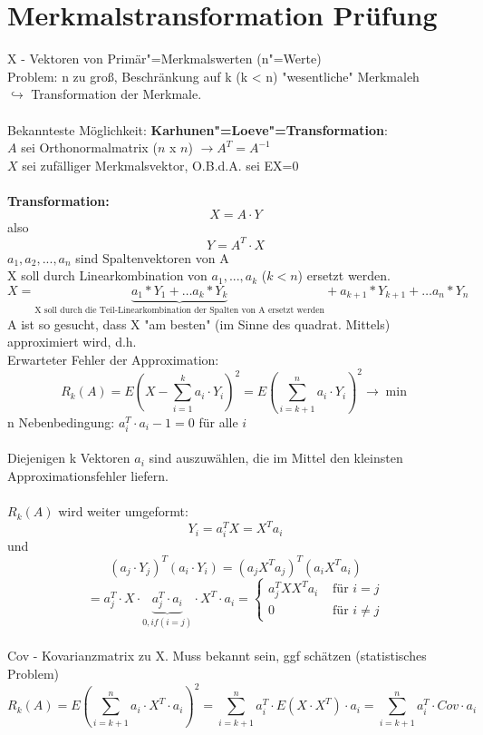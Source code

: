 \documentclass[a4paper,12pt]{scrreprt}
\newcommand{\Nb}[1]{\textbf{#1}}
\begin{document}
\section{Merkmalstransformation Prüfung}
X - Vektoren von Primär"=Merkmalswerten (n"=Werte)\\
Problem: n zu groß, Beschränkung auf k (k < n) "wesentliche" Merkmaleh\\
$\hookrightarrow$ Transformation der Merkmale.\\
\\
Bekannteste Möglichkeit: \Nb{Karhunen"=Loeve"=Transformation}:\\
$A$ sei Orthonormalmatrix ($n$ x $n$) $ \to A^T = A^{-1}$\\
$X$ sei zufälliger Merkmalsvektor, O.B.d.A. sei EX=0\\
\\
\Nb{Transformation:}\\
$$X=A\cdot Y$$
also
$$Y=A^T\cdot X$$
$a_1, a_2, ..., a_n$ sind Spaltenvektoren von A\\
X soll durch Linearkombination von $a_1,...,a_k$ ($k<n$) ersetzt
werden.\\
$$X=\underbrace{a_1*Y_1+ \dots a_k*Y_k}_{\text{X soll durch die Teil-Linearkombination der Spalten von A ersetzt werden}} + a_{k+1}*Y_{k+1} +\dots a_n*Y_n$$
A ist so gesucht, dass X "am besten" (im Sinne des quadrat. Mittels) approximiert wird, d.h.\\
Erwarteter Fehler der Approximation:\\
$$R_k(A)=E(X-\sum\limits_{i=1}^k a_i\cdot Y_i)^2 =
E(\sum\limits_{i=k+1}^n a_i\cdot Y_i)^2 \to \min$$
n Nebenbedingung: $a_i^T\cdot a_i -1 = 0$ für alle $i$\\
\\
Diejenigen k Vektoren $a_i$ sind auszuwählen, die im Mittel den kleinsten
Approximationsfehler liefern.\\
\\
$R_k(A)$ wird weiter umgeformt:
$$Y_i=a_i^TX=X^Ta_i$$
und\\ 
$$(a_j\cdot Y_j)^T(a_i\cdot Y_i) = (a_jX^Ta_j)^T(a_iX^Ta_i) $$
$$= a_j^T\cdot X\cdot \underbrace{ a_j^T\cdot a_i}_{0, if(i=j)} \cdot X^T\cdot a_i =
\left \{ \begin{matrix} a^T_j XX^T a_i &\text{ für }i=j \\ 0 &\text{ für } i\not =
j\end{matrix} \right.$$
\\
Cov - Kovarianzmatrix zu X. Muss bekannt sein, ggf schätzen (statistisches Problem)
$$R_k(A) = E(\sum\limits_{i=k+1}^n a_i\cdot X^T\cdot a_i)^2= \sum\limits^n_{i=k+1} a_i^T\cdot E(X\cdot X^T)\cdot a_i=\sum\limits^n_{i=k+1}a_i^T\cdot Cov\cdot a_i$$
\end{document}
